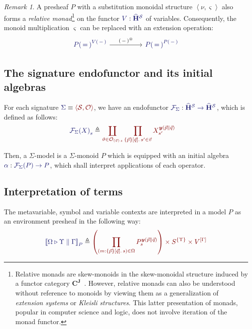 \documentclass[11pt]{article}
\theoremstyle{definition}
\theoremstyle{remark}
\newtheorem{remark}[thm]{Remark}
\numberwithin{equation}{section}
\def\IModeColorName{MidnightBlue}
\def\OModeColorName{Maroon}
\newcommand\IMode[1]{{\color{\IModeColorName}{#1}}}
\newcommand\OMode[1]{{\color{\OModeColorName}{#1}}}
\newcommand\Of[2]{\IMode{#1}: \IMode{#2}}
\newcommand\MkValence[3]{%
  \ifthenelse{\equal{#1}{}}{}{%
    \{#1\}%
  }%
  \ifthenelse{\equal{#2}{}}{}{%
    [#2]%
  }.\, #3%
}
\newcommand\MkArity[2]{(#1)\, #2}
\newcommand\Match[2]{\IMode{#1}\equiv\OMode{#2}}
\newcommand\Sorts{\mathcal{S}}
\newcommand\Operators{\mathcal{O}}
\newcommand\HypCat{\mathbf{H}}
\newcommand\Pair[2]{\left\langle#1, #2 \right\rangle}
\newcommand\Define[2]{\IMode{#1}\triangleq\OMode{#2}}
\newcommand\SigFun[1]{\mathcal{F}_{#1}}
\newcommand\SemBrackets[1]{\left\llbracket#1\right\rrbracket}
\newcommand\Yoneda[1]{\boldsymbol{y} (#1)}
\begin{document}
\begin{remark}
  A presheaf $P$ with a substitution monoidal structure $\Pair{\nu}{\varsigma}$
  also forms a \emph{relative monad}\footnote{Relative monads are skew-monoids
    in the skew-monoidal structure induced by a functor category
    $\mathbf{C}^\mathbf{J}$~\cite{altenkirch-chapman-uustalu:2015}. However,
    relative monads can also be understood without reference to monoids by
    viewing them as a generalization of \emph{extension systems} or
    \emph{Kleisli structures}. This latter presentation of monads, popular in
    computer science and logic, does not involve iteration of the monad
    functor.} on the functor $\Of{V}{\widehat{\HypCat}^\Sorts}$ of variables.
  Consequently, the monoid multiplication $\varsigma$ can be replaced with an
  extension operation:
  \[
    \begin{tikzcd}[ampersand replacement = \&, sep = huge]
      {\IMode{{P(\,=\,)}^{V(\,-\,)}}} \arrow[r, "{(\,-\,)}^{\circledast}"]
      \& {\IMode{{P(\,=\,)}^{P(\,-\,)}}}
    \end{tikzcd}
  \]
\end{remark}

\subsection{The signature endofunctor and its initial algebras}

For each signature $\Match{\Sigma}{\Pair{\Sorts}{\Operators}}$, we have an
endofunctor
$\Of{\SigFun{\Sigma}}{\widehat{\HypCat}^\Sorts\to\widehat{\HypCat}^\Sorts}$,
which is defined as follows:
\begin{align*}
  \IMode{{\SigFun{\Sigma}(X)}_{s}}
    &\triangleq
    \OMode{
      \coprod_{\vartheta\in \Operators_{\MkArity{\vec{v}}{s}}}
      \prod_{\MkValence{\vec{p}}{\vec{q}}{s'}\in\vec{v}}
      X_{s'}^{\Yoneda{\vec{p}\parallel\vec{q}}}
    }
\end{align*}

Then, a $\Sigma$-model is a $\Sigma$-monoid $P$ which is equipped with an initial
algebra $\Of{\alpha}{\SigFun{\Sigma}(P)\to P}$, which shall interpret
applications of each operator.

\subsection{Interpretation of terms}

The metavariable, symbol and variable contexts are interpreted in a model $P$ as an
environment presheaf in the following way:
\[
  \Define{
    \SemBrackets{
      \Omega\triangleright\Upsilon\parallel\Gamma
    }_P
  }{
    \left(\prod_{(m:\MkValence{\vec{p}}{\vec{q}}{s})\in\Omega}P_{s}^{\Yoneda{\vec{p}\parallel\vec{q}}}\right)
    \times
    S^{\{\Upsilon\}}
    \times
    V^{[\Gamma]}
  }
\]
\end{document}
